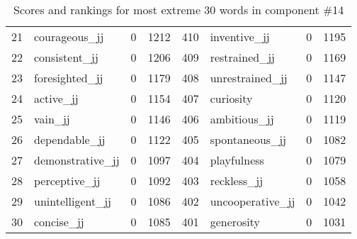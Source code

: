 \begin{table}[tbp]
\begin{tabular}{| rlr@{.}l | rlr@{.}l |}
    21 & courageous\_jj & 0 & 1212    &    410 & inventive\_jj & 0 & 1195 \\
    22 & consistent\_jj & 0 & 1206    &    409 & restrained\_jj & 0 & 1169 \\
    23 & foresighted\_jj & 0 & 1179    &    408 & unrestrained\_jj & 0 & 1147 \\
    24 & active\_jj & 0 & 1154    &    407 & curiosity & 0 & 1120 \\
    25 & vain\_jj & 0 & 1146    &    406 & ambitious\_jj & 0 & 1119 \\
    26 & dependable\_jj & 0 & 1122    &    405 & spontaneous\_jj & 0 & 1082 \\
    27 & demonstrative\_jj & 0 & 1097    &    404 & playfulness & 0 & 1079 \\
    28 & perceptive\_jj & 0 & 1092    &    403 & reckless\_jj & 0 & 1058 \\
    29 & unintelligent\_jj & 0 & 1086    &    402 & uncooperative\_jj & 0 & 1042 \\
    30 & concise\_jj & 0 & 1085    &    401 & generosity & 0 & 1031 \\
    \hline
    \end{tabular}
    \caption{Scores and rankings for most extreme 30 words in component \#14} 
\end{table}
\clearpage
